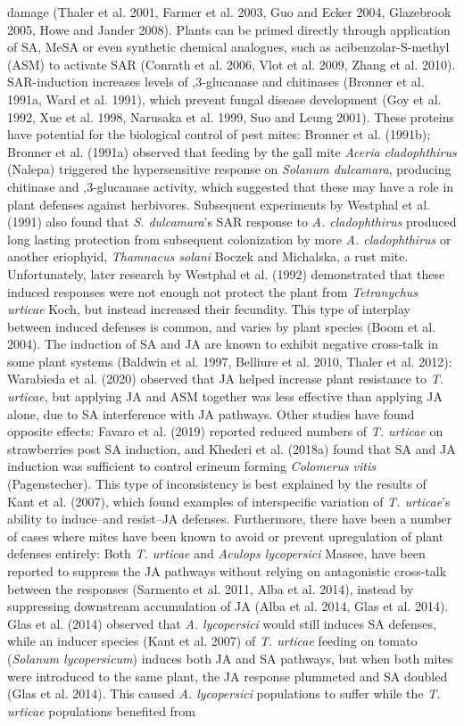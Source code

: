 \documentclass[12pt,final,CPage]{ufthesis}
\begin{document}
{damage (Thaler et al. 2001, Farmer et al. 2003, Guo and Ecker 2004, Glazebrook 2005, Howe and Jander 2008). Plants can be primed directly through application of SA, MeSA or even synthetic chemical analogues, such as acibenzolar-S-methyl (ASM) to activate SAR (Conrath et al. 2006, Vlot et al. 2009, Zhang et al. 2010). SAR-induction increases levels of ,3-glucanase and chitinases (Bronner et al. 1991a, Ward et al. 1991), which prevent fungal disease development (Goy et al. 1992, Xue et al. 1998, Narusaka et al. 1999, Suo and Leung 2001). These proteins have potential for the biological control of pest mites: Bronner et al. (1991b); Bronner et al. (1991a) observed that feeding by the gall mite \emph{Aceria cladophthirus} (Nalepa) triggered the hypersensitive response on \emph{Solanum dulcamara}, producing chitinase and ,3-glucanase activity, which suggested that these may have a role in plant defenses against herbivores. Subsequent experiments by Westphal et al. (1991) also found that \emph{S. dulcamara}'s SAR response to \emph{A. cladophthirus} produced long lasting protection from subsequent colonization by more \emph{A. cladophthirus} or another eriophyid, \emph{Thamnacus solani} Boczek and Michalska, a rust mite. Unfortunately, later research by Westphal et al. (1992) demonstrated that these induced responses were not enough not protect the plant from \emph{Tetranychus urticae} Koch, but instead increased their fecundity. This type of interplay between induced defenses is common, and varies by plant species (Boom et al. 2004). The induction of SA and JA are known to exhibit negative cross-talk in some plant systems (Baldwin et al. 1997, Belliure et al. 2010, Thaler et al. 2012): Warabieda et al. (2020) observed that JA helped increase plant resistance to \emph{T. urticae}, but applying JA and ASM together was less effective than applying JA alone, due to SA interference with JA pathways. Other studies have found opposite effects: Favaro et al. (2019) reported reduced numbers of \emph{T. urticae} on strawberries post SA induction, and Khederi et al. (2018a) found that SA and JA induction was sufficient to control erineum forming \emph{Colomerus vitis} (Pagenstecher). This type of inconsistency is best explained by the results of Kant et al. (2007), which found examples of interspecific variation of \emph{T. urticae}'s ability to induce--and resist--JA defenses. Furthermore, there have been a number of cases where mites have been known to avoid or prevent upregulation of plant defenses entirely: Both \emph{T. urticae} and \emph{Aculops lycopersici} Massee, have been reported to suppress the JA pathways without relying on antagonistic cross-talk between the responses (Sarmento et al. 2011, Alba et al. 2014), instead by suppressing downstream accumulation of JA (Alba et al. 2014, Glas et al. 2014). Glas et al. (2014) observed that \emph{A. lycopersici} would still induces SA defenses, while an inducer species (Kant et al. 2007) of \emph{T. urticae} feeding on tomato (\emph{Solanum lycopersicum}) induces both JA and SA pathways, but when both mites were introduced to the same plant, the JA response plummeted and SA doubled (Glas et al. 2014). This caused \emph{A. lycopersici} populations to suffer while the \emph{T. urticae} populations benefited from }
\end{document}
